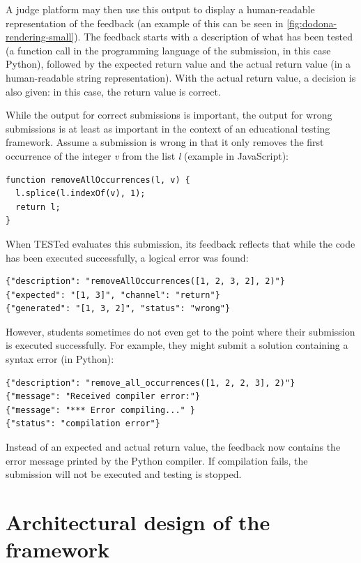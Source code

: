 \documentclass[../main]{subfiles}
\begin{document}
A judge platform may then use this output to display a human-readable representation of the feedback (an example of this can be seen in \cref{fig:dodona-rendering-small}).
The feedback starts with a description of what has been tested (a function call in the programming language of the submission, in this case Python), followed by the expected return value and the actual return value (in a human-readable string representation).
With the actual return value, a decision is also given: in this case, the return value is correct.

While the output for correct submissions is important, the output for wrong submissions is at least as important in the context of an educational testing framework.
Assume a submission is wrong in that it only removes the first occurrence of the integer \textit{v} from the list \textit{l} (example in JavaScript):

\begin{verbatim}
function removeAllOccurrences(l, v) {
  l.splice(l.indexOf(v), 1);
  return l;
}
\end{verbatim}

When TESTed evaluates this submission, its feedback reflects that while the code has been executed successfully, a logical error was found:

\begin{verbatim}
{"description": "removeAllOccurrences([1, 2, 3, 2], 2)"}
{"expected": "[1, 3]", "channel": "return"}
{"generated": "[1, 3, 2]", "status": "wrong"}
\end{verbatim}

However, students sometimes do not even get to the point where their submission is executed successfully.
For example, they might submit a solution containing a syntax error (in Python):

\begin{verbatim}
{"description": "remove_all_occurrences([1, 2, 2, 3], 2)"}
{"message": "Received compiler error:"}
{"message": "*** Error compiling..." }
{"status": "compilation error"}
\end{verbatim}

Instead of an expected and actual return value, the feedback now contains the error message printed by the Python compiler.
If compilation fails, the submission will not be executed and testing is stopped.

\section{Architectural design of the framework}\label{sec:tested1-architectural-design}
\end{document}
